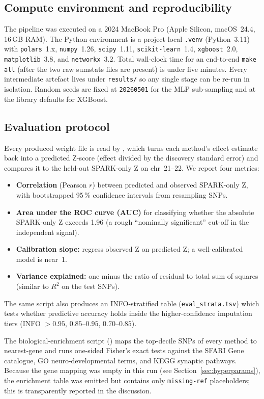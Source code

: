 \subsection{Compute environment and reproducibility}

The pipeline was executed on a 2024 MacBook Pro (Apple Silicon,
macOS~24.4, 16\,GB RAM). The Python environment is a project-local
\texttt{.venv} (Python~3.11) with \texttt{polars}~1.x,
\texttt{numpy}~1.26, \texttt{scipy}~1.11, \texttt{scikit-learn}~1.4,
\texttt{xgboost}~2.0, \texttt{matplotlib}~3.8, and \texttt{networkx}~3.2.
Total wall-clock time for an end-to-end \texttt{make all} (after the
two raw sumstats files are present) is under five minutes. Every
intermediate artefact lives under \texttt{results/} so any single
stage can be re-run in isolation. Random seeds are fixed at
\texttt{20260501} for the MLP sub-sampling and at the library defaults
for XGBoost.

\subsection{Evaluation protocol}

Every produced weight file is read by ,
which turns each method's effect estimate back into a predicted
Z-score (effect divided by the discovery standard error) and compares
it to the held-out SPARK-only Z on chr~21--22. We report four
metrics:
\begin{itemize}[nosep,leftmargin=1.2em]
  \item \textbf{Correlation} (Pearson $r$) between predicted and
        observed SPARK-only Z, with bootstrapped 95\,\% confidence
        intervals from resampling SNPs.
  \item \textbf{Area under the ROC curve (AUC)} for classifying whether
        the absolute SPARK-only Z exceeds 1.96 (a rough ``nominally
        significant'' cut-off in the independent signal).
  \item \textbf{Calibration slope:} regress observed Z on predicted Z;
        a well-calibrated model is near~1.
  \item \textbf{Variance explained:} one minus the ratio of residual to
        total sum of squares (similar to $R^2$ on the test SNPs).
\end{itemize}
The same script also produces an INFO-stratified table
(\texttt{eval\_strata.tsv}) which tests whether predictive accuracy
holds inside the higher-confidence imputation tiers
(INFO $> 0.95$, $0.85$--$0.95$, $0.70$--$0.85$).

The biological-enrichment script
() maps the top-decile SNPs of every
method to nearest-gene and runs one-sided Fisher's exact tests
against the SFARI Gene catalogue, GO neuro-developmental terms, and
KEGG synaptic pathways. Because the gene mapping was empty in this run
(see Section~\ref{sec:hyperparams}), the enrichment table was emitted
but contains only \texttt{missing-ref} placeholders; this is
transparently reported in the discussion.
